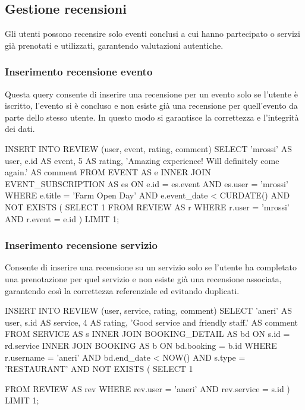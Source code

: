 \documentclass[a4paper,12pt]{report}
\begin{document}
\newpage
\subsection{Gestione recensioni}
Gli utenti possono recensire solo eventi conclusi a cui hanno
partecipato o servizi già prenotati e utilizzati, garantendo
valutazioni autentiche.

\subsubsection{Inserimento recensione evento}
Questa query consente di inserire una recensione per un evento solo
se l'utente è iscritto, l'evento si è concluso e non esiste già una
recensione per quell'evento da parte dello stesso utente. In questo
modo si garantisce la correttezza e l'integrità dei dati.

\begin{sqlcode}[caption={}]
INSERT INTO REVIEW (user, event, rating, comment)
SELECT
  'mrossi' AS user,
  e.id AS event,
  5 AS rating,
  'Amazing experience! Will definitely come again.' AS comment
FROM EVENT AS e
INNER JOIN EVENT_SUBSCRIPTION AS es ON e.id = es.event
  AND es.user = 'mrossi'
WHERE
  e.title = 'Farm Open Day'
  AND e.event_date < CURDATE()
    AND NOT EXISTS (
      SELECT 1
      FROM REVIEW AS r
      WHERE r.user = 'mrossi' AND r.event = e.id
  )
LIMIT 1;
\end{sqlcode}

\subsubsection{Inserimento recensione servizio}
Consente di inserire una recensione su un servizio solo se l'utente
ha completato una prenotazione per quel servizio e non esiste già una
recensione associata, garantendo così la correttezza referenziale ed
evitando duplicati.

\begin{sqlcode}[caption={}]
INSERT INTO REVIEW (user, service, rating, comment)
SELECT
  'aneri' AS user,
  s.id AS service,
  4 AS rating,
  'Good service and friendly staff.' AS comment
FROM SERVICE AS s
INNER JOIN BOOKING_DETAIL AS bd ON s.id = rd.service
INNER JOIN BOOKING AS b ON bd.booking = b.id
WHERE
  r.username = 'aneri'
  AND bd.end_date < NOW()
  AND s.type = 'RESTAURANT'
  AND NOT EXISTS (
    SELECT 1

    FROM REVIEW AS rev
    WHERE rev.user = 'aneri' AND rev.service = s.id
  )
LIMIT 1;
\end{sqlcode}
\end{document}
